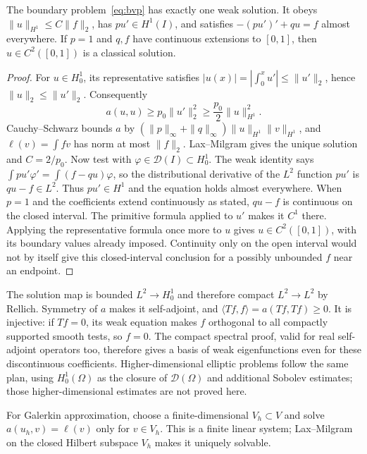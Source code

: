 \begin{theorem}\label{thm:weaksol}
The boundary problem~\eqref{eq:bvp} has exactly one weak solution. It obeys $\|u\|_{H^1}\le C\|f\|_2$, has $pu'\in H^1(I)$, and satisfies $-(pu')'+qu=f$ almost everywhere. If $p=1$ and $q,f$ have continuous extensions to $[0,1]$, then $u\in C^2([0,1])$ is a classical solution.
\end{theorem}
\begin{proof}
For $u\in H^1_0$, its representative satisfies $|u(x)|=|\int_0^xu'|\le\|u'\|_2$, hence $\|u\|_2\le\|u'\|_2$. Consequently
\[
a(u,u)\ge p_0\|u'\|_2^2\ge\frac{p_0}{2}\|u\|_{H^1}^2.
\]
Cauchy--Schwarz bounds $a$ by $(\|p\|_\infty+\|q\|_\infty)\|u\|_{H^1}\|v\|_{H^1}$, and $\ell(v)=\int fv$ has norm at most $\|f\|_2$. Lax--Milgram gives the unique solution and $C=2/p_0$.
Now test with $\varphi\in\mathcal D(I)\subset H^1_0$. The weak identity says $\int pu'\varphi'=\int(f-qu)\varphi$, so the distributional derivative of the $L^2$ function $pu'$ is $qu-f\in L^2$. Thus $pu'\in H^1$ and the equation holds almost everywhere.
When $p=1$ and the coefficients extend continuously as stated, $qu-f$ is continuous on the closed interval. The primitive formula applied to $u'$ makes it $C^1$ there. Applying the representative formula once more to $u$ gives $u\in C^2([0,1])$, with its boundary values already imposed. Continuity only on the open interval would not by itself give this closed-interval conclusion for a possibly unbounded $f$ near an endpoint.
\end{proof}

\begin{remark}
The solution map is bounded $L^2\to H^1_0$ and therefore compact $L^2\to L^2$ by Rellich. Symmetry of $a$ makes it self-adjoint, and $\langle Tf,f\rangle=a(Tf,Tf)\ge0$. It is injective: if $Tf=0$, its weak equation makes $f$ orthogonal to all compactly supported smooth tests, so $f=0$. The compact spectral proof, valid for real self-adjoint operators too, therefore gives a basis of weak eigenfunctions even for these discontinuous coefficients. Higher-dimensional elliptic problems follow the same plan, using $H^1_0(\Omega)$ as the closure of $\mathcal D(\Omega)$ and additional Sobolev estimates; those higher-dimensional estimates are not proved here.
\end{remark}

For Galerkin approximation, choose a finite-dimensional $V_h\subset V$ and solve $a(u_h,v)=\ell(v)$ only for $v\in V_h$. This is a finite linear system; Lax--Milgram on the closed Hilbert subspace $V_h$ makes it uniquely solvable.

